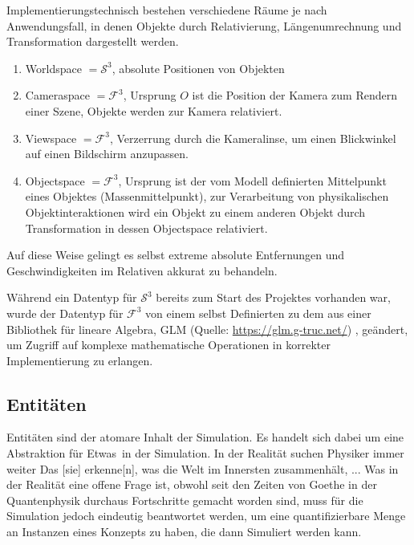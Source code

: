 Implementierungstechnisch bestehen verschiedene Räume je nach Anwendungsfall, in denen Objekte durch Relativierung, Längenumrechnung und Transformation dargestellt werden.

\begin{enumerate}
\item Worldspace $= \mathcal{S}^3$, absolute Positionen von Objekten
\item Cameraspace $= \mathcal{F}^3$, Ursprung $O$ ist die Position der Kamera zum Rendern einer Szene, Objekte werden zur Kamera relativiert.
\item Viewspace $= \mathcal{F}^3$, Verzerrung durch die Kameralinse, um einen Blickwinkel auf einen Bildschirm anzupassen.
\item Objectspace $= \mathcal{F}^3$, Ursprung ist der vom Modell definierten Mittelpunkt eines Objektes (Massenmittelpunkt), zur Verarbeitung von physikalischen Objektinteraktionen wird ein Objekt zu einem anderen Objekt durch Transformation in dessen Objectspace relativiert.
\end{enumerate}

Auf diese Weise gelingt es selbst extreme absolute Entfernungen und Geschwindigkeiten im Relativen akkurat zu behandeln.

Während ein Datentyp für $\mathcal{S}^3$ bereits zum Start des Projektes vorhanden war, wurde der Datentyp für $\mathcal{F}^3$ von einem selbst Definierten zu dem aus einer Bibliothek für lineare Algebra, GLM (Quelle: \url{https://glm.g-truc.net/})
, geändert, um Zugriff auf komplexe mathematische Operationen in korrekter Implementierung zu erlangen.

\subsection{Entitäten}
\label{sec:entity}

Entitäten sind der atomare Inhalt der Simulation. Es handelt sich dabei um eine Abstraktion für \glqq Etwas\grqq ~in der Simulation. In der Realität suchen Physiker immer weiter \glqq Das [sie] erkenne[n], was die Welt im Innersten zusammenhält, ... Was in der Realität eine offene Frage ist, obwohl seit den Zeiten von Goethe in der Quantenphysik durchaus Fortschritte gemacht worden sind, muss für die Simulation jedoch eindeutig beantwortet werden, um eine quantifizierbare Menge an Instanzen eines Konzepts zu haben, die dann Simuliert werden kann.\\

